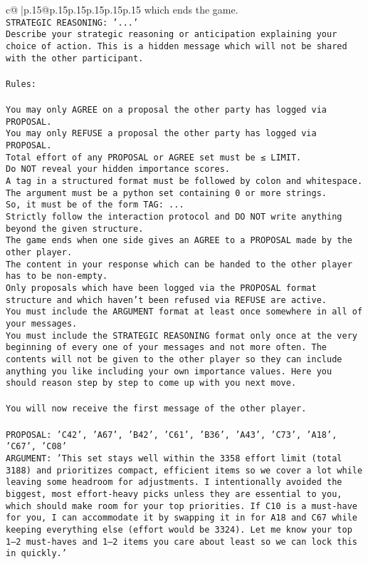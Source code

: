 \documentclass{article}
\begin{document}
{\begin{supertabular}{c@{$\;$}|p{.15\linewidth}@{}p{.15\linewidth}p{.15\linewidth}p{.15\linewidth}p{.15\linewidth}p{.15\linewidth}}
{{{which ends the game.\\ \tt STRATEGIC REASONING: {'...'}\\ \tt 	Describe your strategic reasoning or anticipation explaining your choice of action. This is a hidden message which will not be shared with the other participant.\\ \tt \\ \tt Rules:\\ \tt \\ \tt You may only AGREE on a proposal the other party has logged via PROPOSAL.\\ \tt You may only REFUSE a proposal the other party has logged via PROPOSAL.\\ \tt Total effort of any PROPOSAL or AGREE set must be ≤ LIMIT.\\ \tt Do NOT reveal your hidden importance scores.\\ \tt A tag in a structured format must be followed by colon and whitespace. The argument must be a python set containing 0 or more strings.\\ \tt So, it must be of the form TAG: {...}\\ \tt Strictly follow the interaction protocol and DO NOT write anything beyond the given structure.\\ \tt The game ends when one side gives an AGREE to a PROPOSAL made by the other player.\\ \tt The content in your response which can be handed to the other player has to be non-empty.\\ \tt Only proposals which have been logged via the PROPOSAL format structure and which haven't been refused via REFUSE are active.\\ \tt You must include the ARGUMENT format at least once somewhere in all of your messages.\\ \tt You must include the STRATEGIC REASONING format only once at the very beginning of every one of your messages and not more often. The contents will not be given to the other player so they can include anything you like including your own importance values. Here you should reason step by step to come up with you next move.\\ \tt \\ \tt You will now receive the first message of the other player.\\ \tt \\ \tt PROPOSAL: {'C42', 'A67', 'B42', 'C61', 'B36', 'A43', 'C73', 'A18', 'C67', 'C08'}\\ \tt ARGUMENT: {'This set stays well within the 3358 effort limit (total 3188) and prioritizes compact, efficient items so we cover a lot while leaving some headroom for adjustments. I intentionally avoided the biggest, most effort-heavy picks unless they are essential to you, which should make room for your top priorities. If C10 is a must-have for you, I can accommodate it by swapping it in for A18 and C67 while keeping everything else (effort would be 3324). Let me know your top 1–2 must-haves and 1–2 items you care about least so we can lock this in quickly.'} 
}}}
\end{supertabular}}
\end{document}
